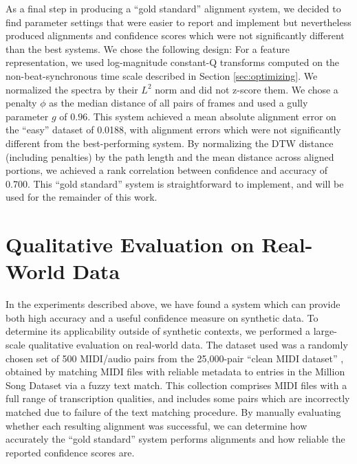 \documentclass{article}
\begin{document}
As a final step in producing a ``gold standard'' alignment system, we decided to find parameter settings that were easier to report and implement but nevertheless produced alignments and confidence scores which were not significantly different than the best systems.
We chose the following design: For a feature representation, we used log-magnitude constant-Q transforms computed on the non-beat-synchronous time scale described in Section \ref{sec:optimizing}.
We normalized the spectra by their $L^2$ norm and did not z-score them.
We chose a penalty $\phi$ as the median distance of all pairs of frames and used a gully parameter $g$ of $0.96$.
This system achieved a mean absolute alignment error on the ``easy'' dataset of 0.0188, with alignment errors which were not significantly different from the best-performing system.
By normalizing the DTW distance (including penalties) by the path length and the mean distance across aligned portions, we achieved a rank correlation between confidence and accuracy of 0.700.
This ``gold standard'' system is straightforward to implement, and will be used for the remainder of this work.

\section{Qualitative Evaluation on Real-World Data}
\label{sec:qualitative}

In the experiments described above, we have found a system which can provide both high accuracy and a useful confidence measure on synthetic data.
To determine its applicability outside of synthetic contexts, we performed a large-scale qualitative evaluation on real-world data.
The dataset used was a randomly chosen set of 500 MIDI/audio pairs from the 25,000-pair ``clean MIDI dataset'' \cite{raffel2015large}, obtained by matching MIDI files with reliable metadata to entries in the Million Song Dataset \cite{bertin2011million} via a fuzzy text match.
This collection comprises MIDI files with a full range of transcription qualities, and includes some pairs which are incorrectly matched due to failure of the text matching procedure.
By manually evaluating whether each resulting alignment was successful, we can determine how accurately the ``gold standard'' system performs alignments and how reliable the reported confidence scores are.
\end{document}
